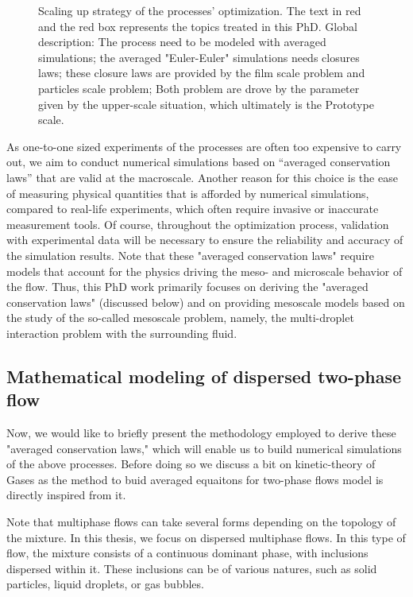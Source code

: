 \begin{figure}[h!]
\begin{tikzpicture}[font=\footnotesize,very thick, scale = 0.9]
    \end{tikzpicture}
    \caption{Scaling up strategy of the processes' optimization.  The text in red and the red box represents the topics treated in this PhD. 
    Global description: 
    The process need to be modeled with averaged simulations; the averaged "Euler-Euler" simulations needs closures laws; these closure laws are provided by the film scale problem and particles scale problem; Both problem are drove by the parameter given by the upper-scale situation, which ultimately is the Prototype scale. }
    \label{fig:scaling_up}
\end{figure}

As one-to-one sized experiments of the processes are often too expensive to carry out, we aim to conduct numerical simulations based on ``averaged conservation laws'' that are valid at the macroscale. 
Another reason for this choice is the ease of measuring physical quantities that is afforded by numerical simulations, compared to real-life experiments, which often require invasive or inaccurate measurement tools.
Of course, throughout the optimization process, validation with experimental data will be necessary to ensure the reliability and accuracy of the simulation results. 
Note that these "averaged conservation laws" require models that account for the physics driving the meso- and microscale behavior of the flow. 
Thus, this PhD work primarily focuses on deriving the "averaged conservation laws" (discussed below) and on providing mesoscale models based on the study of the so-called mesoscale problem, namely, the multi-droplet interaction problem with the surrounding fluid.

\subsection{Mathematical modeling of dispersed two-phase flow}

Now, we would like to briefly present the methodology employed to derive these "averaged conservation laws," which will enable us to build numerical simulations of the above processes.
Before doing so we discuss a bit on kinetic-theory of Gases as the method to buid averaged equaitons for two-phase flows model is directly inspired from it. 

Note that multiphase flows can take several forms depending on the topology of the mixture. In this thesis, we focus on dispersed multiphase flows.
In this type of flow, the mixture consists of a continuous dominant phase, with inclusions dispersed within it. These inclusions can be of various natures, such as solid particles, liquid droplets, or gas bubbles.

